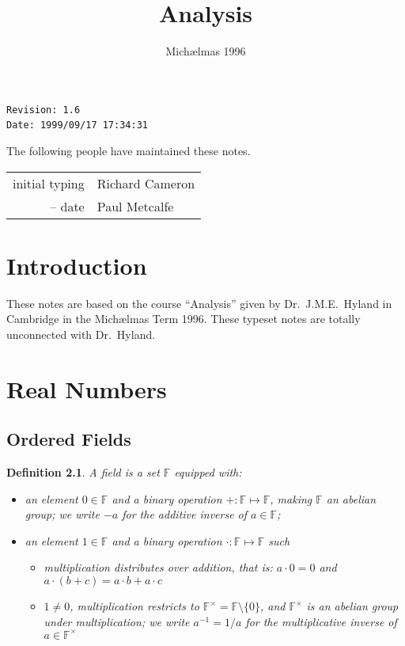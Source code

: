 \documentclass{notes}
\theoremstyle{plain}
\newtheorem{definition}[proposition]{Definition}
\renewcommand{\F}{\mathbb{F}}
\begin{document}
\frontmatter
\title{Analysis}
\date{Mich\ae lmas 1996}

\maketitle

\thispagestyle{empty}
\noindent\verb$Revision: 1.6 $\hfill\\
\noindent\verb$Date: 1999/09/17 17:34:31 $\hfill\

\vspace{1.5in}

The following people have maintained these notes.

\begin{center}
\begin{tabular}{ r  l}
initial typing & Richard Cameron \\
-- date & Paul Metcalfe
\end{tabular}
\end{center}

\tableofcontents

\chapter{Introduction}

These notes are based on the course ``Analysis'' given by
Dr.~J.M.E.~Hyland in Cambridge in the Mich\ae lmas Term 1996.  These
typeset notes are totally unconnected with Dr.~Hyland.

\alsoavailable
\archimcopyright

\mainmatter

\chapter{Real Numbers}
\section{Ordered Fields}
\begin{definition}
\label{d1.1}
A \emph{field} is a set $ \F $ equipped with:
\begin{itemize}
\item an element $ 0 \in \F $ and a binary operation $ 
+\colon \F\mapsto \F $, making $ \F $ an abelian group; we write $ -a 
$ for the additive inverse of $ a \in \F $;
\item an element $ 1 \in \F $ and a binary operation $ \cdot \colon \F 
\mapsto \F $ such
\begin{itemize}
\item multiplication distributes over addition, that is: $ a \cdot 0 
=0 $ and $ a\cdot (b+c)=a\cdot b+a\cdot c $
\item $ 1 \neq 0 $, multiplication restricts to $ \F^{\times}=\F\setminus\{ 
0 \} $, and $ \F^{\times} $ is an abelian group under multiplication; we 
write $ a^{-1}= 1/a $ for the multiplicative inverse of $ a \in 
\F^{\times} $
\end{itemize}
\end{itemize}
\end{definition}
\end{document}
